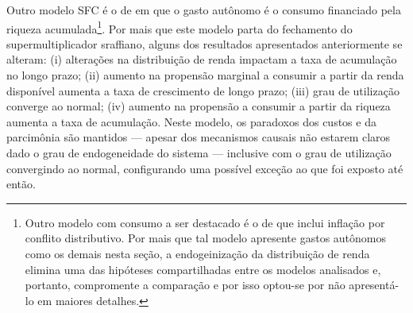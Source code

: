 Outro modelo SFC é o de \textcite{brochier_supermultiplier_2018} em que o gasto autônomo é o consumo financiado pela riqueza acumulada\footnote{
	Outro modelo com consumo a ser destacado é o de \textcite{nah_role_2019} %
	que inclui inflação por conflito distributivo. Por mais que tal modelo apresente gastos autônomos como os demais nesta seção, a endogeinização da distribuição de renda elimina uma das hipóteses compartilhadas entre os modelos analisados e, portanto, compromente a comparação e por isso optou-se por não apresentá-lo em maiores detalhes.
}. 
Por mais que este modelo parta do fechamento do supermultiplicador sraffiano,
alguns dos resultados apresentados anteriormente se alteram: 
	(i) alterações na distribuição de renda impactam a taxa de acumulação no longo prazo; 
	(ii) aumento na propensão marginal a consumir a partir da renda disponível aumenta a taxa de crescimento de longo prazo; 
	(iii) grau de utilização converge ao normal; 
	(iv) aumento na propensão a consumir a partir da riqueza aumenta a taxa de acumulação. 
	Neste modelo, os paradoxos dos custos e da parcimônia são mantidos --- apesar dos mecanismos causais não estarem claros dado o grau de endogeneidade do sistema --- inclusive com o grau de utilização convergindo ao normal, configurando uma possível exceção ao que foi exposto até então.





